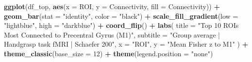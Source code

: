 \documentclass[
]{article}
\newenvironment{Shaded}{\begin{snugshade}}{\end{snugshade}}
\newcommand{\AttributeTok}[1]{\textcolor[rgb]{0.13,0.29,0.53}{#1}}
\newcommand{\DecValTok}[1]{\textcolor[rgb]{0.00,0.00,0.81}{#1}}
\newcommand{\FunctionTok}[1]{\textcolor[rgb]{0.13,0.29,0.53}{\textbf{#1}}}
\newcommand{\NormalTok}[1]{#1}
\newcommand{\SpecialCharTok}[1]{\textcolor[rgb]{0.81,0.36,0.00}{\textbf{#1}}}
\newcommand{\StringTok}[1]{\textcolor[rgb]{0.31,0.60,0.02}{#1}}
\begin{document}
\begin{Shaded}
\begin{Highlighting}[]
\FunctionTok{ggplot}\NormalTok{(df\_top, }\FunctionTok{aes}\NormalTok{(}\AttributeTok{x =}\NormalTok{ ROI, }\AttributeTok{y =}\NormalTok{ Connectivity, }\AttributeTok{fill =}\NormalTok{ Connectivity)) }\SpecialCharTok{+}
  \FunctionTok{geom\_bar}\NormalTok{(}\AttributeTok{stat =} \StringTok{"identity"}\NormalTok{, }\AttributeTok{color =} \StringTok{"black"}\NormalTok{) }\SpecialCharTok{+}
  \FunctionTok{scale\_fill\_gradient}\NormalTok{(}\AttributeTok{low =} \StringTok{"lightblue"}\NormalTok{, }\AttributeTok{high =} \StringTok{"darkblue"}\NormalTok{) }\SpecialCharTok{+}
  \FunctionTok{coord\_flip}\NormalTok{() }\SpecialCharTok{+}
  \FunctionTok{labs}\NormalTok{(}
    \AttributeTok{title    =} \StringTok{"Top 10 ROIs Most Connected to Precentral Gyrus (M1)"}\NormalTok{,}
    \AttributeTok{subtitle =} \StringTok{"Group average | Handgrasp task fMRI | Schaefer 200"}\NormalTok{,}
    \AttributeTok{x        =} \StringTok{"ROI"}\NormalTok{,}
    \AttributeTok{y        =} \StringTok{"Mean Fisher z to M1"}
\NormalTok{  ) }\SpecialCharTok{+}
  \FunctionTok{theme\_classic}\NormalTok{(}\AttributeTok{base\_size =} \DecValTok{12}\NormalTok{) }\SpecialCharTok{+}
  \FunctionTok{theme}\NormalTok{(}\AttributeTok{legend.position =} \StringTok{"none"}\NormalTok{)}
\end{Highlighting}
\end{Shaded}
\end{document}
